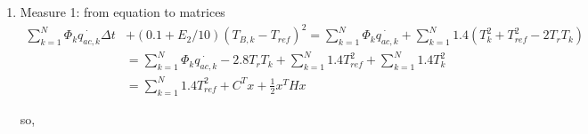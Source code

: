 \documentclass[titlepage,a4paper]{article}
\begin{document}
    \begin{enumerate}
        \item Measure 1: from equation to matrices
        \begin{equation}
            \begin{aligned}
                \sum_{k=1}^N \Phi_k \dot{q_{ac,k}} \Delta t&+(0.1+E_2/10)(T_{B,k}-T_{ref})^2 = \sum_{k=1}^N \Phi_k \dot{q_{ac,k}}+\sum_{k=1}^N 1.4(T_k^2+T_{ref}^2-2T_r T_k) \\
                & =  \sum_{k=1}^N \Phi_k \dot{q_{ac,k}} -2.8 T_r T_k +\sum_{k=1}^N 1.4 T_{ref}^2 +\sum_{k=1}^N 1.4 T_k^2 \\
                & = \sum_{k=1}^N 1.4 T_{ref}^2+ C^T x + \frac{1}{2}x^T H x
            \end{aligned}
        \end{equation}
        
        so,


\end{enumerate}
\end{document}
